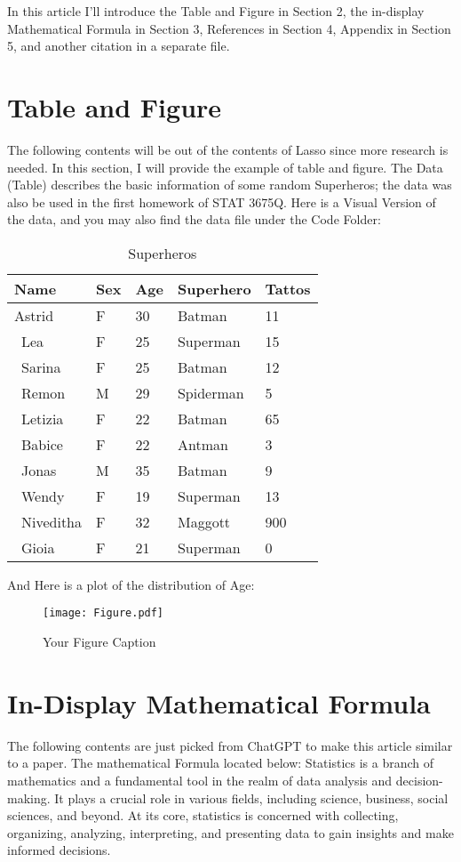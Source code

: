 \documentclass{article}
\begin{document}
In this article I'll introduce the Table and Figure in Section 2, the in-display Mathematical Formula in Section 3, References in Section 4, Appendix in Section 5, and another citation in a separate file.

\section*{Table and Figure}
The following contents will be out of the contents of Lasso since more research is needed. In this section, I will provide the example of table and figure. The Data (Table) describes the basic information of some random Superheros; the data was also be used in the first homework of STAT 3675Q. Here is a Visual Version of the data, and you may also find the data file under the Code Folder:

\begin{table}[h]
\begin{center}
\caption{Superheros}
\begin{tabular}{|l|l|l|l|l|}
\hline
Name      & Sex & Age & Superhero & Tattos \\ \hline
Astrid    & F   & 30  & Batman    & 11     \\ \
Lea       & F   & 25  & Superman  & 15     \\ \
Sarina    & F   & 25  & Batman    & 12     \\ \
Remon     & M   & 29  & Spiderman & 5      \\ \
Letizia   & F   & 22  & Batman    & 65     \\ \
Babice    & F   & 22  & Antman    & 3      \\ \
Jonas     & M   & 35  & Batman    & 9      \\ \
Wendy     & F   & 19  & Superman  & 13     \\ \
Niveditha & F   & 32  & Maggott   & 900    \\ \
Gioia     & F   & 21  & Superman  & 0      \\ \hline
\end{tabular}
\end{center}
\end{table}
And Here is a plot of the distribution of Age:
\begin{figure}[htbp]
    \centering
    \texttt{[image: Figure.pdf]}
    \caption{Your Figure Caption}
    \label{fig:your-label}
\end{figure}
\section*{In-Display Mathematical Formula}
The following contents are just picked from ChatGPT to make this article similar to a paper. The mathematical Formula located below: Statistics is a branch of mathematics and a fundamental tool in the realm of data analysis and decision-making. It plays a crucial role in various fields, including science, business, social sciences, and beyond. At its core, statistics is concerned with collecting, organizing, analyzing, interpreting, and presenting data to gain insights and make informed decisions.
\end{document}
